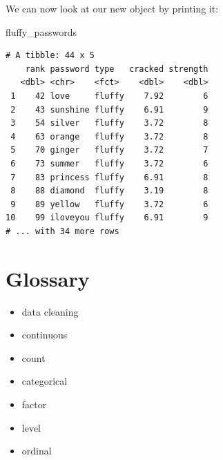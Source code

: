 \documentclass[]{book}
\newenvironment{Shaded}{\begin{snugshade}}{\end{snugshade}}
\newcommand{\NormalTok}[1]{#1}
\begin{document}
We can now look at our new object by printing it:

\begin{Shaded}
\begin{Highlighting}[]
\NormalTok{fluffy_passwords}
\end{Highlighting}
\end{Shaded}

\begin{verbatim}
# A tibble: 44 x 5
    rank password type   cracked strength
   <dbl> <chr>    <fct>    <dbl>    <dbl>
 1    42 love     fluffy    7.92        6
 2    43 sunshine fluffy    6.91        9
 3    54 silver   fluffy    3.72        8
 4    63 orange   fluffy    3.72        8
 5    70 ginger   fluffy    3.72        7
 6    73 summer   fluffy    3.72        6
 7    83 princess fluffy    6.91        8
 8    88 diamond  fluffy    3.19        8
 9    89 yellow   fluffy    3.72        6
10    99 iloveyou fluffy    6.91        9
# ... with 34 more rows
\end{verbatim}

\hypertarget{glossary-1}{%
\section{Glossary}\label{glossary-1}}

\begin{itemize}
\item
  data cleaning
\item
  continuous
\item
  count
\item
  categorical
\item
  factor
\item
  level
\item
  ordinal
\end{itemize}
\end{document}
